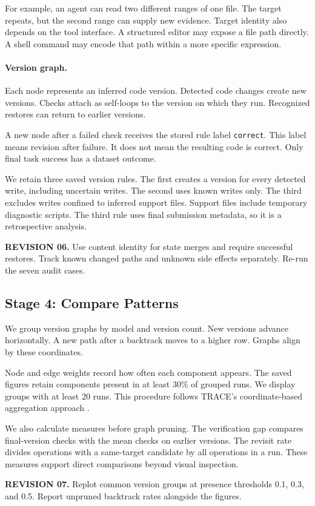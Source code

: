 \documentclass[10pt,a4paper,twocolumn]{article}
\newcommand{\rev}[2]{\par\smallskip\noindent\begin{minipage}{\linewidth}\color{revision}\footnotesize\textbf{REVISION #1.} #2\end{minipage}\par\smallskip}
\begin{document}
For example, an agent can read two different ranges of one file. The target repeats, but the second range can supply new evidence. Target identity also depends on the tool interface. A structured editor may expose a file path directly. A shell command may encode that path within a more specific expression.

\paragraph{Version graph.}
Each node represents an inferred code version. Detected code changes create new versions. Checks attach as self-loops to the version on which they run. Recognized restores can return to earlier versions.

A new node after a failed check receives the stored rule label \texttt{correct}. This label means revision after failure. It does not mean the resulting code is correct. Only final task success has a dataset outcome.

We retain three saved version rules. The first creates a version for every detected write, including uncertain writes. The second uses known writes only. The third excludes writes confined to inferred support files. Support files include temporary diagnostic scripts. The third rule uses final submission metadata, so it is a retrospective analysis.
\rev{06}{Use content identity for state merges and require successful restores. Track known changed paths and unknown side effects separately. Re-run the seven audit cases.}

\subsection{Stage 4: Compare Patterns}
We group version graphs by model and version count. New versions advance horizontally. A new path after a backtrack moves to a higher row. Graphs align by these coordinates.

Node and edge weights record how often each component appears. The saved figures retain components present in at least 30\% of grouped runs. We display groups with at least 20 runs. This procedure follows TRACE's coordinate-based aggregation approach \citep{trace}.

We also calculate measures before graph pruning. The verification gap compares final-version checks with the mean checks on earlier versions. The revisit rate divides operations with a same-target candidate by all operations in a run. These measures support direct comparisons beyond visual inspection.
\rev{07}{Replot common version groups at presence thresholds 0.1, 0.3, and 0.5. Report unpruned backtrack rates alongside the figures.}
\end{document}

